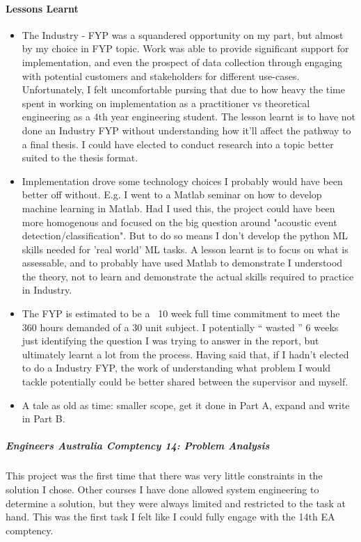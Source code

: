 \documentclass{UoNMCHA}
\newcommand{\inlineQuote}[1]{`` #1 ''}
\numberwithin{equation}{section}
\begin{document}
\paragraph{Lessons Learnt}
\begin{itemize}
    \item The Industry - FYP was a squandered opportunity on my part, but almost by my choice in FYP topic. Work was able to provide significant support for implementation, and even the prospect of data collection through engaging with potential customers and stakeholders for different use-cases. Unfortunately, I felt uncomfortable pursing that due to how heavy the time spent in working on implementation as a practitioner vs theoretical engineering as a 4th year engineering student.  The lesson learnt is to have not done an Industry FYP without understanding how it'll affect the pathway to a final thesis. I could have elected to conduct research into a topic better suited to the thesis format. 
    \item Implementation drove some technology choices I probably would have been better off without. E.g. I went to a Matlab seminar on how to develop machine learning in Matlab. Had I used this, the project could have been more homogenous and focused on the big question around "acoustic event detection/classification". But to do so means I don't develop the python ML skills needed for 'real world' ML tasks. A lesson learnt is to focus on what is assessable, and to probably have used Matlab to demonstrate I understood the theory, not to learn and demonstrate the actual skills required to practice in Industry.
    \item The FYP is estimated to be a ~10 week full time commitment to meet the 360 hours demanded of a 30 unit subject. I potentially \inlineQuote{wasted} 6 weeks just identifying the question I was trying to answer in the report, but ultimately learnt a lot from the process. Having said that, if I hadn't elected to do a Industry FYP, the work of understanding what problem I would tackle potentially could be better shared between the supervisor and myself.
    \item A tale as old as time: smaller scope, get it done in Part A, expand and write in Part B.
\end{itemize}


\subparagraph{Engineers Australia Comptency 14: Problem Analysis}
This project was the first time that there was very little constraints in the solution I chose. Other courses I have done allowed system engineering to determine a solution, but they were always limited and restricted to the task at hand. This was the first task I felt like I could fully engage with the 14th EA comptency.
\end{document}
